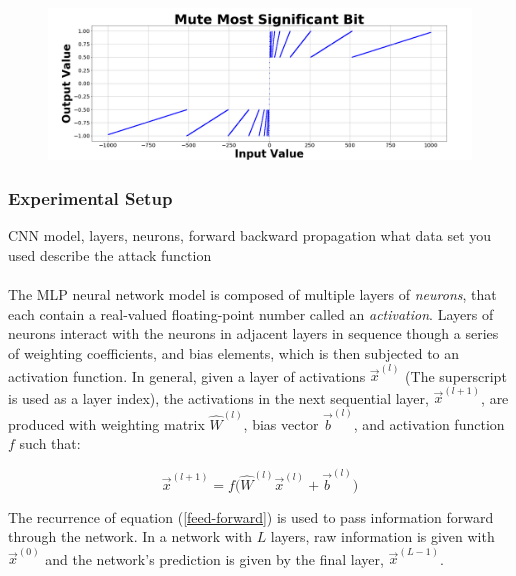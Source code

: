 \documentclass[12pt,letterpaper]{article}
\begin{document}
\begin{figure}[h]
\label{MUTE MSB}
\begin{center}
\includegraphics[scale=0.3]{Mute_Most_Significant_Bit}
\end{center}
\end{figure}

\paragraph*{}


\subsubsection{Experimental Setup}
CNN model, layers, neurons, forward backward propagation
what data set you used 
describe the attack function

\paragraph*{}The MLP neural network model is composed of multiple layers of \textit{neurons}, that each contain a real-valued floating-point number called an \textit{activation}. Layers of neurons interact with the neurons in adjacent layers in sequence though a series of weighting coefficients, and bias elements, which is then subjected to an activation function. In general, given a layer of activations $\vec{x}^{(l)}$ (The superscript is used as a layer index), the activations in the next sequential layer, $\vec{x}^{(l+1)}$, are produced with weighting matrix $\hat{W}^{(l)}$, bias vector $\vec{b}^{(l)}$, and activation function $f$ such that:

\begin{equation}
\label{feed-forward}
\vec{x}^{(l+1)} = f \Big( \hat{W}^{(l)} \vec{x}^{(l)} + \vec{b}^{(l)} \Big)
\end{equation}

The recurrence of equation (\ref{feed-forward}) is used to pass information forward through the network. In a network with $L$ layers, raw information is given with $\vec{x}^{(0)}$ and the network's prediction is given by the final layer, $\vec{x}^{(L-1)}$.
\end{document}
